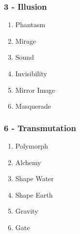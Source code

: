 \begin{multicols}{3}
\subsubsection*{3 - Illusion }
\begin{enumerate}
    \item {Phantasm}
    \item {Mirage}
    \item {Sound}
    \item {Invisibility}
    \item {Mirror Image}
    \item {Masquerade}
\end{enumerate}
\subsubsection*{6 - Transmutation}
\begin{enumerate}
    \item {Polymorph}
    \item {Alchemy}
    \item {Shape Water}
    \item {Shape Earth}
    \item {Gravity}
    \item {Gate}
\end{enumerate}
\end{multicols}
